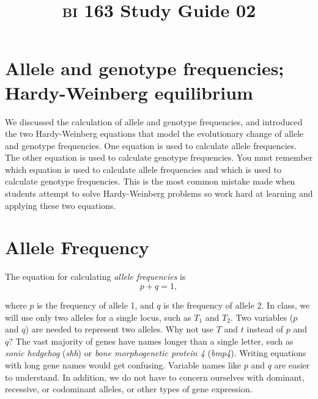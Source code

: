 \documentclass[letterpaper]{tufte-handout}
\title{{\scshape bi} 163 Study Guide 02}
\date{} %
\begin{document}
\maketitle	%

\section*{Allele and genotype frequencies; Hardy-Weinberg equilibrium}

We 
discussed the calculation of allele and genotype frequencies, and
introduced the two Hardy-Weinberg equations that model the evolutionary
change of allele and genotype frequencies. One equation is used to 
calculate allele frequencies. The other equation is used to calculate 
genotype frequencies. You must remember which equation is used to 
calculate allele frequencies and which is used to calculate genotype 
frequencies. This is the most common mistake made when students 
attempt to solve Hardy-Weinberg problems so work hard at learning
and applying these two equations.

\section*{Allele Frequency}

The equation for calculating \emph{allele frequencies} is 
\begin{equation*}
p+q = 1,
\end{equation*}

where $p$ is the frequency of allele 1, and $q$ is the frequency of allele 2. In class, we will use only two alleles for a single locus, such as $T_1$ and $T_2$.  Two variables ($p$ and $q$) are needed to represent two alleles.  Why not use $T$ and $t$ instead of $p$ and $q$?  The vast majority of genes have names longer than a single letter, such as \emph{sonic hedgehog} (\emph{shh}) or \emph{bone morphogenetic protein 4} (\emph{bmp4}). Writing equations with long gene names would get confusing. Variable names like $p$ and $q$ are easier to understand.  In addition, we do not have to concern ourselves with dominant, recessive, or codominant alleles, or other types of gene expression. 
\end{document}
